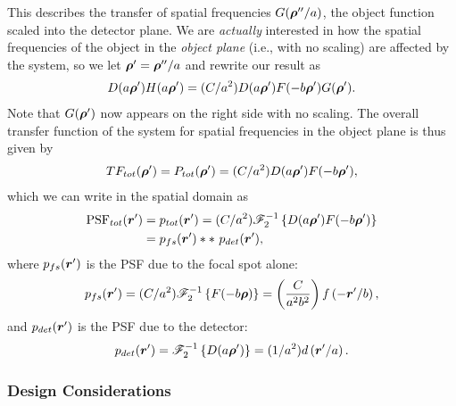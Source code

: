 \documentclass[mphy386-notes.tex]{subfiles}
\begin{document}
This describes the transfer of spatial frequencies $G(\boldsymbol{\rho}''/a)$, the
object function scaled into the detector plane. We are \textit{actually}
interested in how the spatial frequencies of the object in the \textit{object
  plane} (i.e., with no scaling) are affected by the system, so we let
$\boldsymbol{\rho}' = \boldsymbol{\rho}''/a$ and rewrite our result as
\begin{align}
  D(a\boldsymbol{\rho}')H(a\boldsymbol{\rho}') = (C/a^2)D(a\boldsymbol{\rho}')F(-b\boldsymbol{\rho}')G(\boldsymbol{\rho}').
\end{align}
Note that $G(\boldsymbol{\rho}')$ now appears on the right side with no scaling. The
overall transfer function of the system for spatial frequencies in the object
plane is thus given by
\begin{align}
  TF_{tot}(\boldsymbol{\rho}') = P_{tot}(\boldsymbol{\rho}') = (C/a^2)D(a\boldsymbol{\rho}')F(-b\boldsymbol{\rho}'),
  \label{eq:TFtot}
\end{align}
which we can write in the spatial domain as
\begin{align}
  \text{PSF}_{tot}(\boldsymbol{r}') &= p_{tot}(\boldsymbol{r}') = (C/a^2)\mathscr{F}_2^{-1}\left\{D(a\boldsymbol{\rho}')F(-b\boldsymbol{\rho}')\right\}\\
                               &= p_{fs}(\boldsymbol{r}') \ast \ast \text{ }p_{det}(\boldsymbol{r}'),
\end{align}
where $p_{fs}(\boldsymbol{r}')$ is the PSF due to the focal spot alone:
\begin{align}
  p_{fs}(\boldsymbol{r}') = (C/a^2)\mathscr{F}_2^{-1}\left\{F(-b\boldsymbol{\rho})\right\} = \left(\frac{C}{a^2b^2}\right)f\left(-\boldsymbol{r}'/b\right),
  \label{eq:psffs}
\end{align}
and $p_{det}(\boldsymbol{r}')$ is the PSF due to the detector:
\begin{align}
  p_{det}(\boldsymbol{r}') = \mathscr{F}_2^{-1}\left\{D(a\boldsymbol{\rho}')\right\} = (1/a^2)d\left(\boldsymbol{r}'/a\right).
  \label{eq:psfdet}
\end{align}

\subsubsection{Design Considerations}
\end{document}
